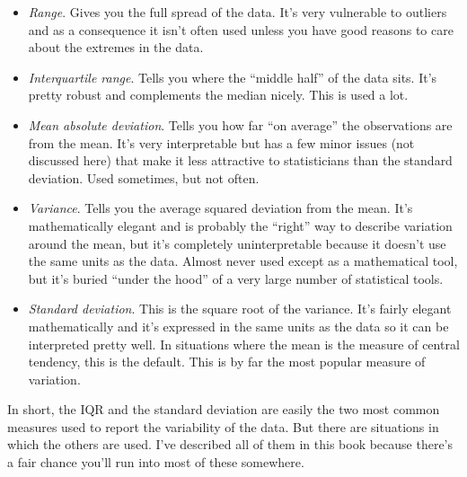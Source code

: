 \documentclass[
]{book}
\providecommand{\tightlist}{%
  \setlength{\itemsep}{0pt}\setlength{\parskip}{0pt}}
\begin{document}
\begin{itemize}
\tightlist
\item
  \emph{Range}. Gives you the full spread of the data. It's very vulnerable to outliers and as a consequence it isn't often used unless you have good reasons to care about the extremes in the data.
\item
  \emph{Interquartile range}. Tells you where the ``middle half'' of the data sits. It's pretty robust and complements the median nicely. This is used a lot.
\item
  \emph{Mean absolute deviation}. Tells you how far ``on average'' the observations are from the mean. It's very interpretable but has a few minor issues (not discussed here) that make it less attractive to statisticians than the standard deviation. Used sometimes, but not often.
\item
  \emph{Variance}. Tells you the average squared deviation from the mean. It's mathematically elegant and is probably the ``right'' way to describe variation around the mean, but it's completely uninterpretable because it doesn't use the same units as the data. Almost never used except as a mathematical tool, but it's buried ``under the hood'' of a very large number of statistical tools.
\item
  \emph{Standard deviation}. This is the square root of the variance. It's fairly elegant mathematically and it's expressed in the same units as the data so it can be interpreted pretty well. In situations where the mean is the measure of central tendency, this is the default. This is by far the most popular measure of variation.
\end{itemize}

In short, the IQR and the standard deviation are easily the two most common measures used to report the variability of the data. But there are situations in which the others are used. I've described all of them in this book because there's a fair chance you'll run into most of these somewhere.
\end{document}
